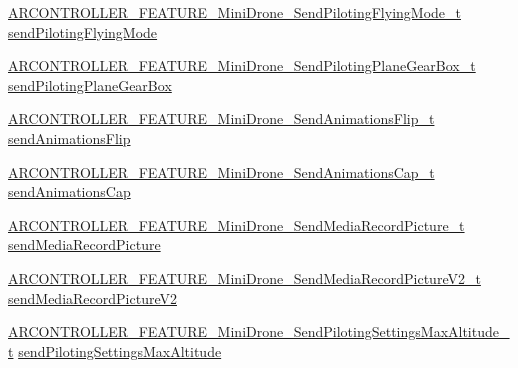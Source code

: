 \begin{DoxyCompactItemize}
\item 
\hyperlink{_a_r_c_o_n_t_r_o_l_l_e_r___feature_8h_a622a02129787ccfbbd5b5f61395adaa9}{A\+R\+C\+O\+N\+T\+R\+O\+L\+L\+E\+R\+\_\+\+F\+E\+A\+T\+U\+R\+E\+\_\+\+Mini\+Drone\+\_\+\+Send\+Piloting\+Flying\+Mode\+\_\+t} \hyperlink{struct_a_r_c_o_n_t_r_o_l_l_e_r___f_e_a_t_u_r_e___mini_drone__t_a733492bd525ba6eaacb7b2b7de659060}{send\+Piloting\+Flying\+Mode}
\item 
\hyperlink{_a_r_c_o_n_t_r_o_l_l_e_r___feature_8h_a3ad0c909f8fea2bca95225f7d39946ad}{A\+R\+C\+O\+N\+T\+R\+O\+L\+L\+E\+R\+\_\+\+F\+E\+A\+T\+U\+R\+E\+\_\+\+Mini\+Drone\+\_\+\+Send\+Piloting\+Plane\+Gear\+Box\+\_\+t} \hyperlink{struct_a_r_c_o_n_t_r_o_l_l_e_r___f_e_a_t_u_r_e___mini_drone__t_ab68c2edd1f9be4174520b1aff8fd35e8}{send\+Piloting\+Plane\+Gear\+Box}
\item 
\hyperlink{_a_r_c_o_n_t_r_o_l_l_e_r___feature_8h_a4837af121d06f633cbe27d17d33d0158}{A\+R\+C\+O\+N\+T\+R\+O\+L\+L\+E\+R\+\_\+\+F\+E\+A\+T\+U\+R\+E\+\_\+\+Mini\+Drone\+\_\+\+Send\+Animations\+Flip\+\_\+t} \hyperlink{struct_a_r_c_o_n_t_r_o_l_l_e_r___f_e_a_t_u_r_e___mini_drone__t_ada9906bd2ed81c6d00cbe48495356a41}{send\+Animations\+Flip}
\item 
\hyperlink{_a_r_c_o_n_t_r_o_l_l_e_r___feature_8h_a346679f85126465c6aaafe03dd22d823}{A\+R\+C\+O\+N\+T\+R\+O\+L\+L\+E\+R\+\_\+\+F\+E\+A\+T\+U\+R\+E\+\_\+\+Mini\+Drone\+\_\+\+Send\+Animations\+Cap\+\_\+t} \hyperlink{struct_a_r_c_o_n_t_r_o_l_l_e_r___f_e_a_t_u_r_e___mini_drone__t_a644b55c41030857acb49e5561c836290}{send\+Animations\+Cap}
\item 
\hyperlink{_a_r_c_o_n_t_r_o_l_l_e_r___feature_8h_a208ded0f2c2f2fcacb48bf0ccb81d1db}{A\+R\+C\+O\+N\+T\+R\+O\+L\+L\+E\+R\+\_\+\+F\+E\+A\+T\+U\+R\+E\+\_\+\+Mini\+Drone\+\_\+\+Send\+Media\+Record\+Picture\+\_\+t} \hyperlink{struct_a_r_c_o_n_t_r_o_l_l_e_r___f_e_a_t_u_r_e___mini_drone__t_a8b18af3455ef1c23fad1b30253239f18}{send\+Media\+Record\+Picture}
\item 
\hyperlink{_a_r_c_o_n_t_r_o_l_l_e_r___feature_8h_ad6281a091f017dadcfb95e3526102e14}{A\+R\+C\+O\+N\+T\+R\+O\+L\+L\+E\+R\+\_\+\+F\+E\+A\+T\+U\+R\+E\+\_\+\+Mini\+Drone\+\_\+\+Send\+Media\+Record\+Picture\+V2\+\_\+t} \hyperlink{struct_a_r_c_o_n_t_r_o_l_l_e_r___f_e_a_t_u_r_e___mini_drone__t_ad9425fb0cfc5e2b169d75ac23b23e118}{send\+Media\+Record\+Picture\+V2}
\item 
\hyperlink{_a_r_c_o_n_t_r_o_l_l_e_r___feature_8h_aa955dfdab630db10b4805f4ee7cfb9bf}{A\+R\+C\+O\+N\+T\+R\+O\+L\+L\+E\+R\+\_\+\+F\+E\+A\+T\+U\+R\+E\+\_\+\+Mini\+Drone\+\_\+\+Send\+Piloting\+Settings\+Max\+Altitude\+\_\+t} \hyperlink{struct_a_r_c_o_n_t_r_o_l_l_e_r___f_e_a_t_u_r_e___mini_drone__t_a635e5558717ea694a210a76af8a4314e}{send\+Piloting\+Settings\+Max\+Altitude}

\end{DoxyCompactItemize}
